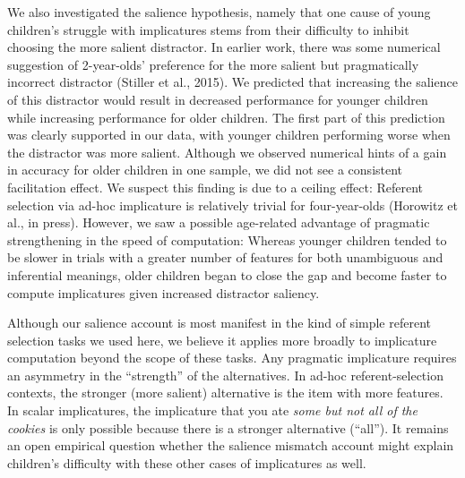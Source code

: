 \documentclass[man]{apa6}
\theoremstyle{definition}
\theoremstyle{definition}
\theoremstyle{definition}
\theoremstyle{remark}
\begin{document}
We also investigated the salience hypothesis, namely that one cause of
young children's struggle with implicatures stems from their difficulty
to inhibit choosing the more salient distractor. In earlier work, there
was some numerical suggestion of 2-year-olds' preference for the more
salient but pragmatically incorrect distractor (Stiller et al., 2015).
We predicted that increasing the salience of this distractor would
result in decreased performance for younger children while increasing
performance for older children. The first part of this prediction was
clearly supported in our data, with younger children performing worse
when the distractor was more salient. Although we observed numerical
hints of a gain in accuracy for older children in one sample, we did not
see a consistent facilitation effect. We suspect this finding is due to
a ceiling effect: Referent selection via ad-hoc implicature is
relatively trivial for four-year-olds (Horowitz et al., in press).
However, we saw a possible age-related advantage of pragmatic
strengthening in the speed of computation: Whereas younger children
tended to be slower in trials with a greater number of features for both
unambiguous and inferential meanings, older children began to close the
gap and become faster to compute implicatures given increased distractor
saliency.

Although our salience account is most manifest in the kind of simple
referent selection tasks we used here, we believe it applies more
broadly to implicature computation beyond the scope of these tasks. Any
pragmatic implicature requires an asymmetry in the \enquote{strength} of
the alternatives. In ad-hoc referent-selection contexts, the stronger
(more salient) alternative is the item with more features. In scalar
implicatures, the implicature that you ate \emph{some but not all of the
cookies} is only possible because there is a stronger alternative
(\enquote{all}). It remains an open empirical question whether the
salience mismatch account might explain children's difficulty with these
other cases of implicatures as well.
\end{document}
